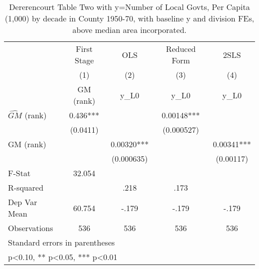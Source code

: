 \begin{table}[htbp]\centering
\def\sym#1{\ifmmode^{#1}\else\(^{#1}\)\fi}
\caption{Dererencourt Table Two with y=Number of Local Govts, Per Capita (1,000) by decade in County 1950-70, with baseline y and division FEs, above median area incorporated.}
\begin{tabular}{l*{4}{c}}
\toprule
                    & First Stage   &         OLS   &Reduced Form   &        2SLS   \\
                    &\multicolumn{1}{c}{(1)}&\multicolumn{1}{c}{(2)}&\multicolumn{1}{c}{(3)}&\multicolumn{1}{c}{(4)}\\
                    &\multicolumn{1}{c}{GM  (rank)}&\multicolumn{1}{c}{y\_L0}&\multicolumn{1}{c}{y\_L0}&\multicolumn{1}{c}{y\_L0}\\
\midrule
$\hat{GM}$ (rank)   &       0.436***&               &     0.00148***&               \\
                    &    (0.0411)   &               &  (0.000527)   &               \\
\addlinespace
GM  (rank)          &               &     0.00320***&               &     0.00341***\\
                    &               &  (0.000635)   &               &   (0.00117)   \\
\midrule
F-Stat              &      32.054   &               &               &               \\
R-squared           &               &        .218   &        .173   &               \\
Dep Var Mean        &      60.754   &       -.179   &       -.179   &       -.179   \\
Observations        &         536   &         536   &         536   &         536   \\
\bottomrule
\multicolumn{5}{l}{\footnotesize Standard errors in parentheses}\\
\multicolumn{5}{l}{\footnotesize * p<0.10, ** p<0.05, *** p<0.01}\\
\end{tabular}
\end{table}
